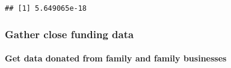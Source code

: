 \documentclass[
]{article}
\begin{document}
\begin{verbatim}
## [1] 5.649065e-18
\end{verbatim}

\hypertarget{gather-close-funding-data}{%
\subsubsection{Gather close funding
data}\label{gather-close-funding-data}}

\hypertarget{get-data-donated-from-family-and-family-businesses}{%
\paragraph{Get data donated from family and family
businesses}\label{get-data-donated-from-family-and-family-businesses}}
\end{document}
